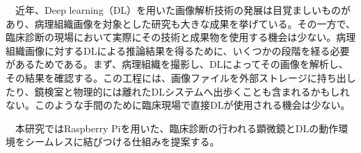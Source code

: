 　近年、Deep learning（DL）を用いた画像解析技術の発展は目覚ましいものがあり、病理組織画像を対象とした研究も大きな成果を挙げている。その一方で、臨床診断の現場において実際にその技術と成果物を使用する機会は少ない。病理組織画像に対するDLによる推論結果を得るために、いくつかの段階を経る必要があるためである。まず、病理組織を撮影し、DLによってその画像を解析し、その結果を確認する。この工程には、画像ファイルを外部ストレージに持ち出したり、鏡検室と物理的には離れたDLシステムへ出歩くことも含まれるかもしれない。このような手間のために臨床現場で直接DLが使用される機会は少ない。\par
\vspace{0.5zh}
　本研究ではRaspberry Piを用いた、臨床診断の行われる顕微鏡とDLの動作環境をシームレスに結びつける仕組みを提案する。\par
